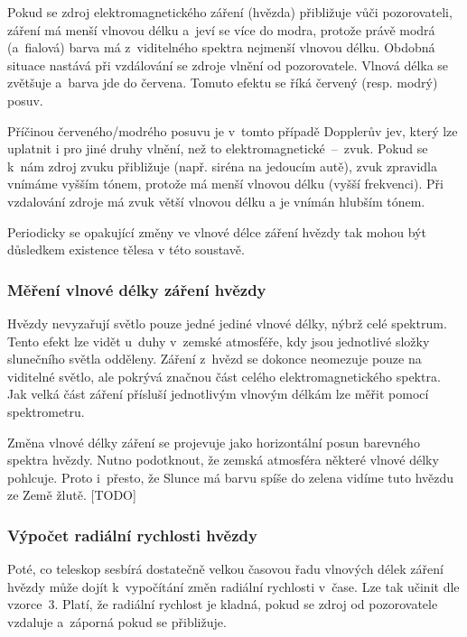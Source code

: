 \documentclass[a4paper,12pt]{article}
\begin{document}
Pokud se zdroj elektromagnetického záření (hvězda) přibližuje vůči pozorovateli, záření má menší vlnovou délku a~jeví se více do modra, protože právě modrá (a~fialová) barva má z~viditelného spektra nejmenší vlnovou délku. Obdobná situace nastává při vzdálování se zdroje vlnění od pozorovatele. Vlnová délka se zvětšuje a~barva jde do červena. Tomuto efektu se říká červený (resp. modrý) posuv.~\cite{methods}

\drawgimp

Příčinou červeného/modrého posuvu je v~tomto případě Dopplerův jev, který lze uplatnit i pro jiné druhy vlnění, než to elektromagnetické~--~zvuk. Pokud se k~nám zdroj zvuku přibližuje (např. siréna na jedoucím autě), zvuk zpravidla vnímáme vyšším tónem, protože má menší vlnovou délku (vyšší frekvenci). Při vzdalování zdroje má zvuk větší vlnovou délku a je vnímán hlubším tónem.~\cite{radialvelocity}

Periodicky se opakující změny ve vlnové délce záření hvězdy tak mohou být důsledkem existence tělesa v této soustavě.~\cite{methods}

\subsubsection{Měření vlnové délky záření hvězdy}

Hvězdy nevyzařují světlo pouze jedné jediné vlnové délky, nýbrž celé spektrum. Tento efekt lze vidět  u~duhy v~zemské atmosféře, kdy jsou jednotlivé složky slunečního světla odděleny. Záření z~hvězd se dokonce neomezuje pouze na viditelné světlo, ale pokrývá značnou část celého elektromagnetického spektra. Jak velká část záření přísluší jednotlivým vlnovým délkám lze měřit pomocí spektrometru.~\cite{radialvelocity, sunlight}


Změna vlnové délky záření se projevuje jako horizontální posun barevného spektra hvězdy. Nutno podotknout, že zemská atmosféra některé vlnové délky pohlcuje. Proto i~přesto, že Slunce má barvu spíše do zelena vidíme tuto hvězdu ze Země žlutě. [TODO]

\subsubsection{Výpočet radiální rychlosti hvězdy}

Poté, co teleskop sesbírá dostatečně velkou časovou řadu vlnových délek záření hvězdy může dojít k~vypočítání změn radiální rychlosti v~čase. Lze tak učinit dle vzorce~3. Platí, že radiální rychlost je kladná, pokud se zdroj od pozorovatele vzdaluje a~záporná pokud se přibližuje.~\cite{methods}
\end{document}
